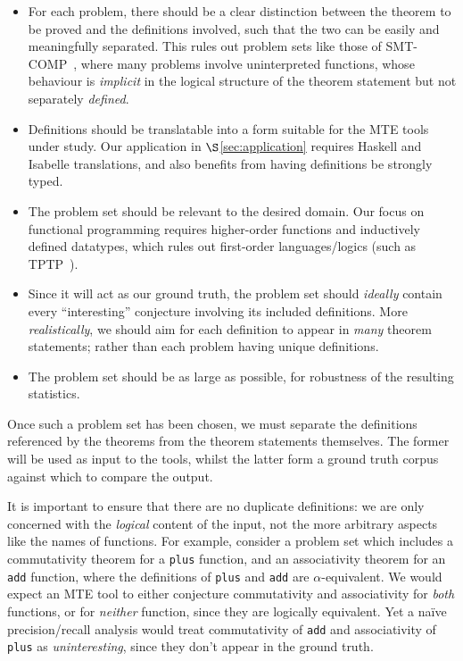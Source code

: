 \begin{itemize}
\item For each problem, there should be a clear distinction between the theorem
  to be proved and the definitions involved, such that the two can be easily and
  meaningfully separated. This rules out problem sets like those of
  SMT-COMP~\cite{barrett2005smt}, where many problems involve uninterpreted
  functions, whose behaviour is \emph{implicit} in the logical structure of the
  theorem statement but not separately \emph{defined}.
\item Definitions should be translatable into a form suitable for the MTE tools
  under study. Our application in $\S$\ref{sec:application} requires Haskell and
  Isabelle translations, and also benefits from having definitions be strongly
  typed.
\item The problem set should be relevant to the desired domain. Our focus on
  functional programming requires higher-order functions and inductively defined
  datatypes, which rules out first-order languages/logics (such as
  TPTP~\cite{sutcliffe2009tptp}).
\item Since it will act as our ground truth, the problem set should
  \emph{ideally} contain every ``interesting'' conjecture involving its included
  definitions. More \emph{realistically}, we should aim for each definition to
  appear in \emph{many} theorem statements; rather than each problem having
  unique definitions. %
\item The problem set should be as large as possible, for robustness of the
  resulting statistics. %
\end{itemize}

Once such a problem set has been chosen, we must separate the definitions
referenced by the theorems from the theorem statements themselves. The former
will be used as input to the tools, whilst the latter form a ground truth corpus
against which to compare the output.

It is important to ensure that there are no duplicate definitions: we are only
concerned with the \emph{logical} content of the input, not the more arbitrary
aspects like the names of functions. For example, consider a problem set which
includes a commutativity theorem for a \texttt{plus} function, and an
associativity theorem for an \texttt{add} function, where the definitions of
\texttt{plus} and \texttt{add} are $\alpha$-equivalent. We would expect an MTE
tool to either conjecture commutativity and associativity for \emph{both}
functions, or for \emph{neither} function, since they are logically equivalent.
Yet a na\"ive precision/recall analysis would treat commutativity of
\texttt{add} and associativity of \texttt{plus} as \emph{uninteresting}, since
they don't appear in the ground truth.

